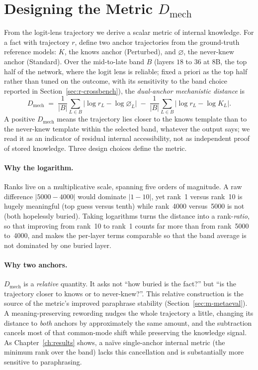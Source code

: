 \section{Designing the Metric \texorpdfstring{$D_\text{mech}$}{D\_mech}}
\label{sec:m-metric}

From the logit-lens trajectory we derive a scalar metric of internal knowledge. For a fact with trajectory
$r$, define two anchor trajectories from the ground-truth reference models: $K$, the knows anchor
(Perturbed), and $\varnothing$, the never-knew anchor (Standard). Over the mid-to-late band $B$ (layers
$18$ to $36$ at 8B, the top half of the network, where the logit lens is reliable; fixed a priori as the top
half rather than tuned on the outcome, with its sensitivity to the band choice reported in
Section~\ref{sec:r-crossbench}), the \emph{dual-anchor mechanistic distance} is
\begin{equation}
  D_\text{mech} \;=\; \frac{1}{|B|}\sum_{L\in B}\bigl|\log r_L - \log \varnothing_L\bigr|
                    \;-\; \frac{1}{|B|}\sum_{L\in B}\bigl|\log r_L - \log K_L\bigr|.
  \label{eq:dmech}
\end{equation}
A positive $D_\text{mech}$ means the trajectory lies closer to the knows template than to the never-knew
template within the selected band, whatever the output says; we read it as an indicator of residual internal
accessibility, not as independent proof of stored knowledge. Three design choices define the metric.

\paragraph{Why the logarithm.}
Ranks live on a multiplicative scale, spanning five orders of magnitude. A raw difference $|5000-4000|$
would dominate $|1-10|$, yet rank~1 versus rank~10 is hugely meaningful (top guess versus tenth) while
rank~4000 versus~5000 is not (both hopelessly buried). Taking logarithms turns the distance into a
rank-\emph{ratio}, so that improving from rank~10 to rank~1 counts far more than from rank~5000 to~4000,
and makes the per-layer terms comparable so that the band average is not dominated by one buried layer.

\paragraph{Why two anchors.}
$D_\text{mech}$ is a \emph{relative} quantity. It asks not ``how buried is the fact?'' but ``is the
trajectory closer to knows or to never-knew?''. This relative construction is the source of the metric's
improved paraphrase stability (Section~\ref{sec:m-metaeval}). A meaning-preserving rewording nudges the whole
trajectory a little, changing its distance to \emph{both} anchors by approximately the same amount, and the
subtraction cancels most of that common-mode shift while preserving the knowledge signal. As
Chapter~\ref{ch:results} shows, a na\"ive single-anchor internal metric (the minimum rank over the band)
lacks this cancellation and is substantially more sensitive to paraphrasing.

